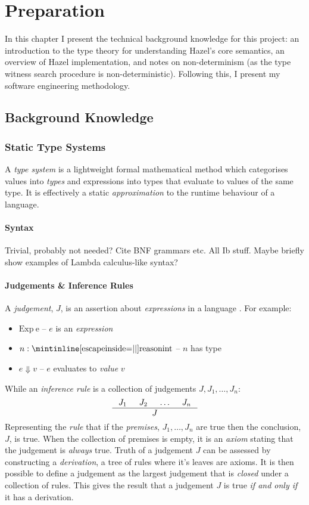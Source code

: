 \chapter{Preparation}
In this chapter I present the technical background knowledge for this project: an introduction to the type theory for understanding Hazel's core semantics, an overview of Hazel implementation, and notes on non-determinism (as the type witness search procedure is non-deterministic). Following this, I present my software engineering methodology.

\section{Background Knowledge}
\subsection{Static Type Systems}
A \textit{type system} is a lightweight formal mathematical method which categorises values into \textit{types} and expressions into types that evaluate to values of the same type. It is effectively a static \textit{approximation} to the runtime behaviour of a language. 

\subsubsection{Syntax}
Trivial, probably not needed? Cite BNF grammars etc. All Ib stuff.
Maybe briefly show examples of Lambda calculus-like syntax?
\subsubsection{Judgements \& Inference Rules}
A \textit{judgement}, $J$, is an assertion about \textit{expressions} in a language \cite{PracticalFoundations}. For example: \begin{itemize}
\item $\mathrm{Exp\ e}$ -- $e$ is an \textit{expression} 
\item $n : \code{int}$ -- $n$ has type 
\item $e \Downarrow v$ -- $e$ evaluates to \textit{value} $v$ 
\end{itemize}
While an \textit{inference rule} is a collection of judgements $J, J_1, \dots, J_n$:
\[\inference{J_1 & J_2 & \dots & J_n}{J}\]
Representing the \textit{rule} that if the \textit{premises}, $J_1, \dots, J_n$ are true then the conclusion, $J$, is true. When the collection of premises is empty, it is an \textit{axiom} stating that the judgement is \textit{always} true. Truth of a judgement $J$ can be assessed by constructing a \textit{derivation}, a tree of rules where it's leaves are axioms. It is then possible to define a judgement as the largest judgement that is \textit{closed} under a collection of rules. This gives the result that a judgement $J$ is true \textit{if and only if} it has a derivation.

